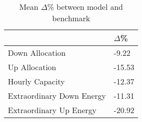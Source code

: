 \begin{table}[H] 
    \caption{Mean $\Delta$\% between model and benchmark\label{model_vs_bench_perc}}
    \begin{tabularx}{\textwidth}{CC}
    \toprule
    & \textbf{$\Delta$\%} \\
    

    \midrule
            Down Allocation 	        & -9.22 \\
            Up Allocation               & -15.53 \\
            Hourly Capacity 	        & -12.37 \\
            Extraordinary Down Energy 	& -11.31 \\
            Extraordinary Up Energy 	& -20.92 \\
    \bottomrule
    \end{tabularx}
\end{table}

